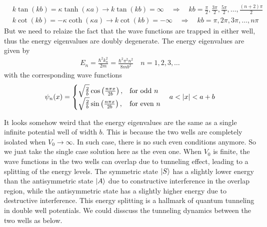 \begin{align}
    &k \tan(kb) = \kappa \tanh(\kappa a) \to k \tan(kb) = \infty \quad \Longrightarrow \quad kb = \frac{\pi}{2}, \frac{3\pi}{2}, \frac{5\pi}{2}, \dots, \frac{(n+2)\pi}{2} \\
    &k \cot(kb) = - \kappa \coth(\kappa a) \to k \cot(kb) = -\infty \quad \Longrightarrow \quad kb = \pi, 2\pi, 3\pi, \dots , n\pi
\end{align}
But we need to relaize the fact that the wave functions are trapped in either well, thus the energy eigenvalues are doubly degenerate. The energy eigenvalues are given by
\begin{align}
    E_n = \frac{\hbar^2 k_n^2}{2m} = \frac{\hbar^2 \pi^2 n^2}{8 m b^2} \quad n = 1, 2, 3, \dots
\end{align}
with the corresponding wave functions
\begin{align}
    \psi_n(x) = \begin{cases}
        \sqrt{\frac{2}{b}} \cos\left(\frac{n \pi x}{2b}\right), & \text{for odd } n \\
        \sqrt{\frac{2}{b}} \sin\left(\frac{n \pi x}{2b}\right), & \text{for even } n \\
    \end{cases} \quad a < \left| x \right| < a+b
\end{align}
\begin{figure}[h!]
    \centering
\end{figure}

It looks somehow weird that the energy eigenvalues are the same as a single infinite potential well of width $b$. This is because the two wells are completely isolated when $V_0 \to \infty$. In such case, there is no such even conditions anymore. So we juat take the single case solution here as the even one. When $V_0$ is finite, the wave functions in the two wells can overlap due to tunneling effect, leading to a splitting of the energy levels. The symmetric state $\ket S$ has a slightly lower energy than the antisymmetric state $\ket A$ due to constructive interference in the overlap region, while the antisymmetric state has a slightly higher energy due to destructive interference. This energy splitting is a hallmark of quantum tunneling in double well potentials.
We could disscuss the tunneling dynamics between the two wells as below.

